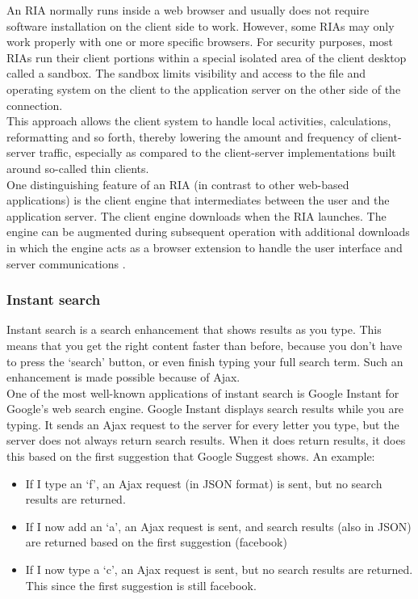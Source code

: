An RIA normally runs inside a web browser and usually does not require software installation on the client side to work. However, some RIAs may only work properly with one or more specific browsers. For security purposes, most RIAs run their client portions within a special isolated area of the client desktop called a sandbox. The sandbox limits visibility and access to the file and operating system on the client to the application server on the other side of the connection.\\
 
This approach allows the client system to handle local activities, calculations, reformatting and so forth, thereby lowering the amount and frequency of client-server traffic, especially as compared to the client-server implementations built around so-called thin clients.\\
 
One distinguishing feature of an RIA (in contrast to other web-based applications) is the client engine that intermediates between the user and the application server. The client engine downloads when the RIA launches. The engine can be augmented during subsequent operation with additional downloads in which the engine acts as a browser extension to handle the user interface and server communications \cite{busch2009rich}.
		
\subsubsection{Instant search}
Instant search is a search enhancement that shows results as you type. This means that you get the right content faster than before, because you don't have to press the `search' button, or even finish typing your full search term. Such an enhancement is made possible because of Ajax.\\
	
One of the most well-known applications of instant search is Google Instant for Google's web search engine. Google Instant displays search results while you are typing. It sends an Ajax request to the server for every letter you type, but the server does not always return search results. When it does return results, it does this based on the first suggestion that Google Suggest shows. An example:
\begin{itemize}
	\setlength\itemsep{0em}
	\item If I type an `f', an Ajax request (in JSON format) is sent, but no search results are returned.
	\item If I now add an `a', an Ajax request is sent, and search results (also in JSON) are returned based on the first suggestion (facebook)
	\item If I now type a `c', an Ajax request is sent, but no search results are returned. This since the first suggestion is still facebook.
\end{itemize}
	
